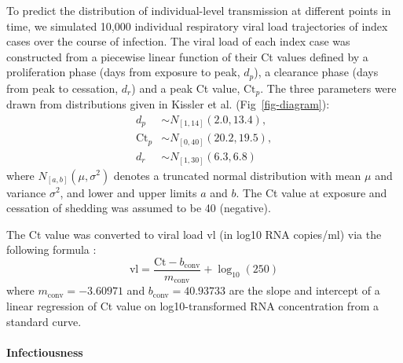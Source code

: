 \documentclass[
  10pt,
  letterpaper,
]{article}
\begin{document}
To predict the distribution of individual-level transmission at
different points in time, we simulated 10,000 individual respiratory
viral load trajectories of index cases over the course of infection. The
viral load of each index case was constructed from a piecewise linear
function of their Ct values defined by a proliferation phase (days from
exposure to peak, \(d_p\)), a clearance phase (days from peak to
cessation, \(d_r\)) and a peak Ct value, \(\mathrm{Ct}_p\). The three
parameters were drawn from distributions given in Kissler et al.
\citep{kissler2021} (Fig~\ref{fig-diagram}): \[
\begin{aligned}
d_p &\sim N_{[1,14]}(2.0, 13.4), \\
\mathrm{Ct}_p &\sim N_{[0,40]}(20.2, 19.5), \\
d_r &\sim N_{[1,30]}(6.3, 6.8)
\end{aligned}
\] where \(N_{[a,b]}(\mu, \sigma^2)\) denotes a truncated normal
distribution with mean \(\mu\) and variance \(\sigma^2\), and lower and
upper limits \(a\) and \(b\). The Ct value at exposure and cessation of
shedding was assumed to be 40 (negative).

The Ct value was converted to viral load \(\mathrm{vl}\) (in log10 RNA
copies/ml) via the following formula \citep{kissler2021}: \[
\mathrm{vl} = \frac{\mathrm{Ct} - b_{\mathrm{conv}}}{m_{\mathrm{conv}}} + \log_{10}(250)
\] where \(m_{\mathrm{conv}}=-3.60971\) and
\(b_{\mathrm{conv}}=40.93733\) are the slope and intercept of a linear
regression of Ct value on log10-transformed RNA concentration from a
standard curve.

\paragraph{Infectiousness}\label{infectiousness}
\end{document}
